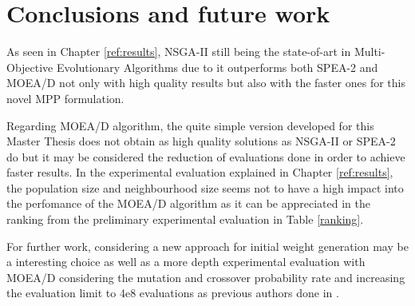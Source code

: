 \section{Conclusions and future work}

As seen in Chapter \ref{ref:results}, NSGA-II still being the state-of-art in Multi-Objective Evolutionary Algorithms due to it outperforms both SPEA-2 and MOEA/D not only with high quality results but also with the faster ones for this novel MPP formulation.

Regarding MOEA/D algorithm, the quite simple version developed for this Master Thesis does not obtain as high quality solutions as NSGA-II or SPEA-2 do but it may be considered the reduction of evaluations done in order to achieve faster results. In the experimental evaluation explained in Chapter \ref{ref:results}, the population size and neighbourhood size seems not to have a high impact into the perfomance of the MOEA/D algorithm as it can be appreciated in the ranking from the preliminary experimental evaluation in Table \ref{ranking}. 


For further work, considering a new approach for initial weight generation may be a interesting choice as well as a more depth experimental evaluation with MOEA/D considering the mutation and crossover probability rate and increasing the evaluation limit to 4e8 evaluations as previous authors done in \cite{Miranda2018}.
 